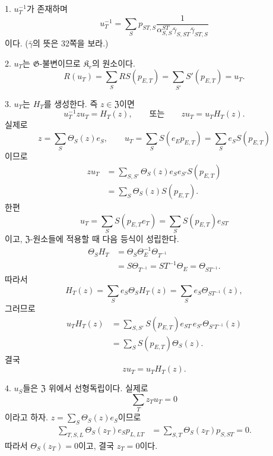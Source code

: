 1. \(u_T^{-1}\)가 존재하며
\[
        u_T^{-1}
        =\sum_Sp_{ST,S}
         \frac{1}
         {\alpha_{S,S}^{ST}
          \overline\gamma_{S,ST}
          \overline\gamma_{ST,S}}
\]
이다. (\(\bar\gamma\)의 뜻은 32쪽을 보라.)

2. \(u_T\)는 \(\mathfrak G\)-불변이므로 \(\mathfrak K_r\)의 원소이다.
\[
        R(u_T)
        =\sum_SRS(p_{E,T})
        =\sum_{S'}S'(p_{E,T})
        =u_T.
\]

3. \(u_T\)는 \(H_T\)를 생성한다. 즉 \(z\in\mathfrak Z\)이면
\[
        u_T^{-1}zu_T=H_T(z),
        \qquad\text{또는}\qquad
        zu_T=u_TH_T(z).
\]
실제로
\[
        z=\sum_S\Theta_S(z)e_S,
        \qquad
        u_T=\sum_SS(e_Ep_{E,T})
            =\sum_Se_SS(p_{E,T})
\]
이므로
\[
\begin{aligned}
zu_T
 &=\sum_{S,S'}\Theta_S(z)e_Se_{S'}S(p_{E,T})\\
 &=\sum_S\Theta_S(z)S(p_{E,T}).
\end{aligned}
\]
한편
\[
        u_T=\sum_SS(p_{E,T}e_T)
            =\sum_SS(p_{E,T})e_{ST}
\]
이고, \(\mathfrak Z\)-원소들에 적용할 때 다음 등식이 성립한다.
\[
\begin{aligned}
\Theta_SH_T
 &=\Theta_S\Theta_E^{-1}\Theta_{T^{-1}}\\
 &=S\Theta_{T^{-1}}
  =ST^{-1}\Theta_E
  =\Theta_{ST^{-1}}.
\end{aligned}
\]
따라서
\[
        H_T(z)
        =\sum_Se_S\Theta_SH_T(z)
        =\sum_Se_S\Theta_{ST^{-1}}(z),
\]
그러므로
\[
\begin{aligned}
u_TH_T(z)
 &=\sum_{S,S'}S(p_{E,T})e_{ST}\,
   e_{S'}\Theta_{S'T^{-1}}(z)\\
 &=\sum_SS(p_{E,T})\Theta_S(z).
\end{aligned}
\]
결국
\[
        zu_T=u_TH_T(z).
\]

4. \(u_S\)들은 \(\mathfrak Z\) 위에서 선형독립이다. 실제로
\[
        \sum_Tz_Tu_T=0
\]
이라고 하자. \(z=\sum_S\Theta_S(z)e_S\)이므로
\[
\begin{aligned}
\sum_{T,S,L}\Theta_S(z_T)e_Sp_{L,LT}
 &=\sum_{S,T}\Theta_S(z_T)p_{S,ST}=0.
\end{aligned}
\]
따라서 \(\Theta_S(z_T)=0\)이고, 결국 \(z_T=0\)이다.

